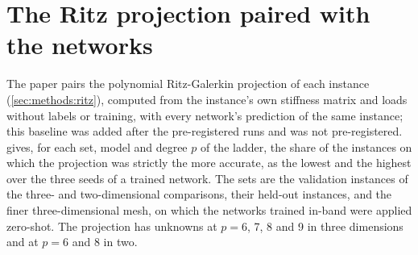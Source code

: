 \section{The Ritz projection paired with the networks}\label{supp:ritz}

The paper pairs the polynomial Ritz-Galerkin projection of each instance
(\cref{sec:methods:ritz}), computed from the instance's own stiffness matrix and loads
without labels or training, with every network's prediction of the same instance; this
baseline was added after the pre-registered runs and was not pre-registered.
 gives, for each set, model and degree $p$ of the ladder, the share of
the instances on which the projection was strictly the more accurate, as the lowest and the
highest over the three seeds of a trained network. The sets are the validation instances of
the three- and two-dimensional comparisons, their held-out instances, and the finer
three-dimensional mesh, on which the networks trained in-band were applied zero-shot. The
projection has \numRitzThreeK{} unknowns at $p=6$, 7, 8 and 9 in three dimensions and
\numRitzTwoK{} at $p=6$ and 8 in two.

\begin{landscape}

\end{landscape}
